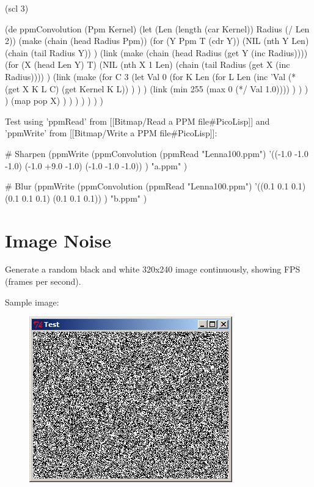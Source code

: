 \begin{wideverbatim}

(scl 3)

(de ppmConvolution (Ppm Kernel)
   (let (Len (length (car Kernel))  Radius (/ Len 2))
      (make
         (chain (head Radius Ppm))
         (for (Y Ppm  T  (cdr Y))
            (NIL (nth Y Len)
               (chain (tail Radius Y)) )
            (link
               (make
                  (chain (head Radius (get Y (inc Radius))))
                  (for (X (head Len Y) T)
                     (NIL (nth X 1 Len)
                        (chain (tail Radius (get X (inc Radius)))) )
                     (link
                        (make
                           (for C 3
                              (let Val 0
                                 (for K Len
                                    (for L Len
                                       (inc 'Val
                                          (* (get X K L C) (get Kernel K L)) ) ) )
                                 (link (min 255 (max 0 (*/ Val 1.0)))) ) ) ) )
                     (map pop X) ) ) ) ) ) ) )

Test using 'ppmRead' from [[Bitmap/Read a PPM file#PicoLisp]] and 'ppmWrite'
from [[Bitmap/Write a PPM file#PicoLisp]]:

# Sharpen
(ppmWrite
   (ppmConvolution
      (ppmRead "Lenna100.ppm")
      '((-1.0 -1.0 -1.0) (-1.0 +9.0 -1.0) (-1.0 -1.0 -1.0)) )
   "a.ppm" )

# Blur
(ppmWrite
   (ppmConvolution
      (ppmRead "Lenna100.ppm")
      '((0.1 0.1 0.1) (0.1 0.1 0.1) (0.1 0.1 0.1)) )
   "b.ppm" )

\end{wideverbatim}

\pagebreak{}
\section*{Image Noise}


Generate a random black and white 320x240 image continuously, showing
FPS (frames per second).

Sample image:

\begin{figure}[H]
\centering
\includegraphics[scale=.6]{graphics/NoiseOutput.png}
\end{figure}

